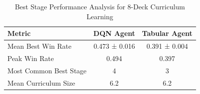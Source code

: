 \begin{table}[h!]
\centering
\caption{Best Stage Performance Analysis for 8-Deck Curriculum Learning}
\label{tab:best_performance_8deck}
\begin{tabular}{lcc}
\hline
Metric & DQN Agent & Tabular Agent \\
\hline
Mean Best Win Rate & 0.473 ± 0.016 & 0.391 ± 0.004 \\
Peak Win Rate & 0.494 & 0.397 \\
Most Common Best Stage & 4 & 3 \\
Mean Curriculum Size & 6.2 & 6.2 \\
\hline
\end{tabular}
\end{table}

